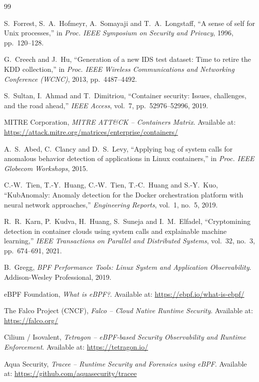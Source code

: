 \begin{thebibliography}{99}

S.~Forrest, S.~A.~Hofmeyr, A.~Somayaji and T.~A.~Longstaff, ``A sense of self for Unix
processes,'' in \textit{Proc. IEEE Symposium on Security and Privacy}, 1996, pp.~120--128.

G.~Creech and J.~Hu, ``Generation of a new IDS test dataset: Time to retire the KDD
collection,'' in \textit{Proc. IEEE Wireless Communications and Networking Conference
(WCNC)}, 2013, pp.~4487--4492.

S.~Sultan, I.~Ahmad and T.~Dimitriou, ``Container security: Issues, challenges, and the
road ahead,'' \textit{IEEE Access}, vol.~7, pp.~52976--52996, 2019.

MITRE Corporation, \textit{MITRE ATT\&CK -- Containers Matrix}. Available at:
\url{https://attack.mitre.org/matrices/enterprise/containers/}

A.~S.~Abed, C.~Clancy and D.~S.~Levy, ``Applying bag of system calls for anomalous
behavior detection of applications in Linux containers,'' in \textit{Proc. IEEE
Globecom Workshops}, 2015.

C.-W.~Tien, T.-Y.~Huang, C.-W.~Tien, T.-C.~Huang and S.-Y.~Kuo, ``KubAnomaly: Anomaly
detection for the Docker orchestration platform with neural network approaches,''
\textit{Engineering Reports}, vol.~1, no.~5, 2019.

R.~R.~Karn, P.~Kudva, H.~Huang, S.~Suneja and I.~M.~Elfadel, ``Cryptomining detection in
container clouds using system calls and explainable machine learning,'' \textit{IEEE
Transactions on Parallel and Distributed Systems}, vol.~32, no.~3, pp.~674--691, 2021.

B.~Gregg, \textit{BPF Performance Tools: Linux System and Application Observability}.
Addison-Wesley Professional, 2019.

eBPF Foundation, \textit{What is eBPF?}. Available at: \url{https://ebpf.io/what-is-ebpf/}

The Falco Project (CNCF), \textit{Falco -- Cloud Native Runtime Security}. Available at:
\url{https://falco.org/}

Cilium / Isovalent, \textit{Tetragon -- eBPF-based Security Observability and Runtime
Enforcement}. Available at: \url{https://tetragon.io/}

Aqua Security, \textit{Tracee -- Runtime Security and Forensics using eBPF}. Available
at: \url{https://github.com/aquasecurity/tracee}


\end{thebibliography}
